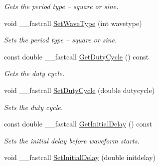 \begin{DoxyCompactItemize}
\begin{DoxyCompactList}\small\item\em Gets the period type -- square or sine. \end{DoxyCompactList}\item 
\hypertarget{class_t_current_a5647d6bf68c5d83957fa1c4201ae0c7f}{void \+\_\+\+\_\+fastcall \hyperlink{class_t_current_a5647d6bf68c5d83957fa1c4201ae0c7f}{Set\+Wave\+Type} (int wavetype)}\label{class_t_current_a5647d6bf68c5d83957fa1c4201ae0c7f}

\begin{DoxyCompactList}\small\item\em Sets the period type -- square or sine. \end{DoxyCompactList}\item 
\hypertarget{class_t_current_a252da7976039d425984a0acae22e8ffe}{const double \+\_\+\+\_\+fastcall \hyperlink{class_t_current_a252da7976039d425984a0acae22e8ffe}{Get\+Duty\+Cycle} () const }\label{class_t_current_a252da7976039d425984a0acae22e8ffe}

\begin{DoxyCompactList}\small\item\em Gets the duty cycle. \end{DoxyCompactList}\item 
\hypertarget{class_t_current_a24857c138d97851171ab6d8c8b7f34ce}{void \+\_\+\+\_\+fastcall \hyperlink{class_t_current_a24857c138d97851171ab6d8c8b7f34ce}{Set\+Duty\+Cycle} (double dutycycle)}\label{class_t_current_a24857c138d97851171ab6d8c8b7f34ce}

\begin{DoxyCompactList}\small\item\em Sets the duty cycle. \end{DoxyCompactList}\item 
\hypertarget{class_t_current_abaad09485880f0d1ec6cbb187587dc84}{const double \+\_\+\+\_\+fastcall \hyperlink{class_t_current_abaad09485880f0d1ec6cbb187587dc84}{Get\+Initial\+Delay} () const }\label{class_t_current_abaad09485880f0d1ec6cbb187587dc84}

\begin{DoxyCompactList}\small\item\em Sets the initial delay before waveform starts. \end{DoxyCompactList}\item 
\hypertarget{class_t_current_a4135c18e9c3b325ab4fb42e1e5117f9a}{void \+\_\+\+\_\+fastcall \hyperlink{class_t_current_a4135c18e9c3b325ab4fb42e1e5117f9a}{Set\+Initial\+Delay} (double initdelay)}\label{class_t_current_a4135c18e9c3b325ab4fb42e1e5117f9a}


\end{DoxyCompactItemize}
